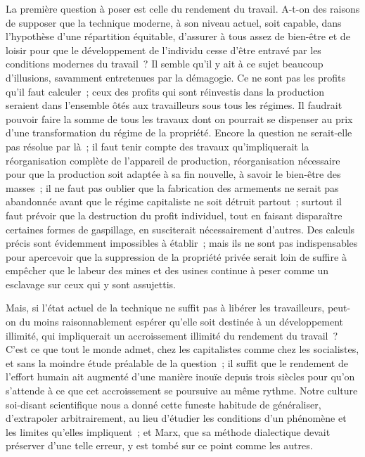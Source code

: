 \documentclass[french,twoside]{book} %
\begin{document}
La première question à poser est celle du rendement du travail. A-t-on des raisons de supposer que la technique moderne, à son niveau actuel, soit capable, dans l'hypothèse d'une répartition équitable, d'assurer à tous assez de bien-être et de loisir pour que le développement de l'individu cesse d'être entravé par les conditions modernes du travail ? Il semble qu'il y ait à ce sujet beaucoup d'illusions, savamment entretenues par la démagogie. Ce ne sont pas les profits qu'il faut calculer ; ceux des profits qui sont réinvestis dans la production seraient dans l'ensemble ôtés aux travailleurs sous tous les régimes. Il faudrait pouvoir faire la somme de tous les travaux dont on pourrait se dispenser au prix d'une transformation du régime de la propriété. Encore la question ne serait-elle pas résolue par là ; il faut tenir compte des travaux qu'impliquerait la réorganisation complète de l'appareil de production, réorganisation nécessaire pour que la production soit adaptée à sa fin nouvelle, à savoir le bien-être des masses ; il ne faut pas oublier que la fabrication des armements ne serait pas abandonnée avant que le régime capitaliste ne soit détruit partout ; surtout il faut prévoir que la destruction du profit individuel, tout en faisant disparaître certaines formes de gaspillage, en susciterait nécessairement d'autres. Des calculs précis sont évidemment impossibles à établir ; mais ils ne sont pas indispensables pour apercevoir que la suppression de la propriété privée serait loin de suffire à empêcher que le labeur des mines et des usines continue à peser comme un esclavage sur ceux qui y sont assujettis.\par
Mais, si l'état actuel de la technique ne suffit pas à libérer les travailleurs, peut-on du moins raisonnablement espérer qu'elle soit destinée à un développement illimité, qui impliquerait un accroissement illimité du rendement du travail ? C'est ce que tout le monde admet, chez les capitalistes comme chez les socialistes, et sans la moindre étude préalable de la question ; il suffit que le rendement de l'effort humain ait augmenté d'une manière inouïe depuis trois siècles pour qu'on s'attende à ce que cet accroissement se poursuive au même rythme. Notre culture soi-disant scientifique nous a donné cette funeste habitude de généraliser, d'extrapoler arbitrairement, au lieu d'étudier les conditions d'un phénomène et les limites qu'elles impliquent ; et Marx, que sa méthode dialectique devait préserver d'une telle erreur, y est tombé sur ce point comme les autres.\par
\end{document}
